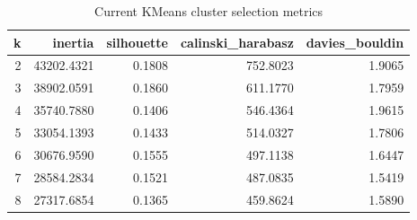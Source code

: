 \begin{table}
\centering
\caption{Current KMeans cluster selection metrics}
\label{tab:clustering-kmeans-scores}
\begin{tabular}{rrrrr}
\toprule
 k &    inertia &  silhouette &  calinski\_harabasz &  davies\_bouldin \\
\midrule
 2 & 43202.4321 &      0.1808 &           752.8023 &          1.9065 \\
 3 & 38902.0591 &      0.1860 &           611.1770 &          1.7959 \\
 4 & 35740.7880 &      0.1406 &           546.4364 &          1.9615 \\
 5 & 33054.1393 &      0.1433 &           514.0327 &          1.7806 \\
 6 & 30676.9590 &      0.1555 &           497.1138 &          1.6447 \\
 7 & 28584.2834 &      0.1521 &           487.0835 &          1.5419 \\
 8 & 27317.6854 &      0.1365 &           459.8624 &          1.5890 \\
\bottomrule
\end{tabular}
\end{table}
